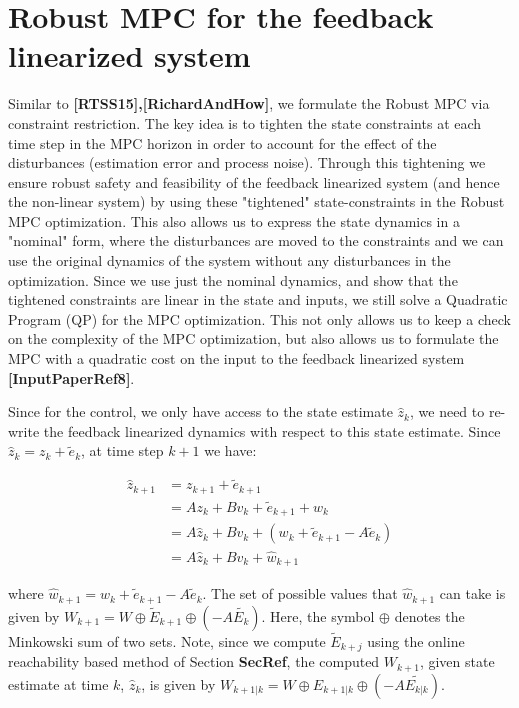 \section{Robust MPC for the feedback linearized system}

Similar to \textbf{[RTSS15],[RichardAndHow]}, we formulate the Robust MPC via constraint restriction. The key idea is to tighten the state constraints at each time step in the MPC horizon in order to account for the effect of the disturbances (estimation error and process noise). Through this tightening we ensure robust safety and feasibility of the feedback linearized system (and hence the non-linear system) by using these "tightened" state-constraints in the Robust MPC optimization. This also allows us to express the state dynamics in a "nominal" form, where the disturbances are moved to the constraints and we can use the original dynamics of the system without any disturbances in the optimization. Since we use just the nominal dynamics, and show that the tightened constraints are linear in the state and inputs, we still solve a Quadratic Program (QP) for the MPC optimization. This not only allows us to keep a check on the complexity of the MPC optimization, but also allows us to formulate the MPC with a quadratic cost on the input to the feedback linearized system \textbf{[InputPaperRef8]}.

Since for the control, we only have access to the state estimate $\hat{z}_k$, we need to re-write the feedback linearized dynamics with respect to this state estimate. Since $\hat{z}_k = z_k +\tilde{e}_k$, at time step $k+1$ we have:

\begin{subequations} \label{eq:dynamics_estimate}
\begin{align}
\hat{z}_{k+1} &= z_{k+1} + \tilde{e}_{k+1} \nonumber \\
&=Az_k + Bv_k + \tilde{e}_{k+1} +w_k \nonumber \\
&=A\hat{z}_k + Bv_k + (w_k+ \tilde{e}_{k+1} -A \tilde{e}_{k})  \nonumber\\
&=A\hat{z}_k + Bv_k + \hat{w}_{k+1}
\end{align}
\end{subequations}

where $\hat{w}_{k+1} = w_k+ \tilde{e}_{k+1} -A \tilde{e}_{k}$. The set of possible values that $\hat{w}_{k+1}$ can take is given by $W_{k+1} = W\oplus\tilde{E}_{k+1}\oplus(-A\tilde{E_k})$. Here, the symbol $\oplus$ denotes the Minkowski sum of two sets. Note, since we compute $\tilde{E}_{k+j}$ using the online reachability based method of Section \textbf{SecRef}, the computed $W_{k+1}$, given state estimate at time $k$, $\hat{z}_k$, is given by $W_{k+1|k}=W\oplus{E}_{k+1|k}\oplus(-A\tilde{E_{k|k}})$. 

